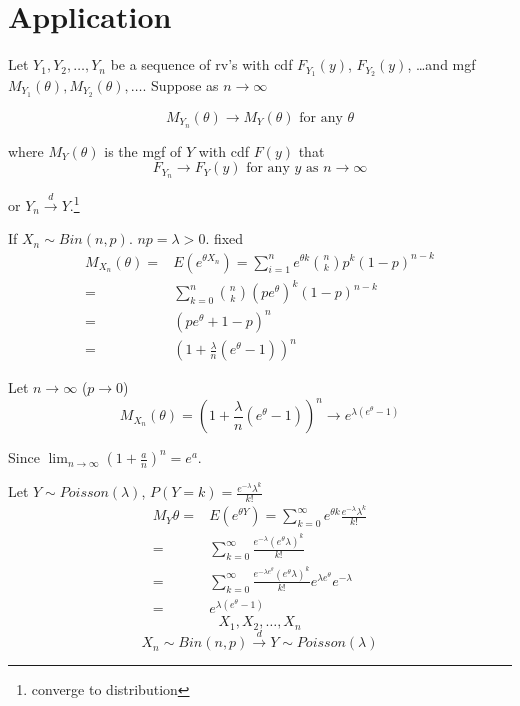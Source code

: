 \section{Application}
\begin{theo}
Let $Y_1,Y_2,\dots,Y_n$ be a sequence of rv's with cdf $F_{Y_1}(y)$, $F_{Y_2}(y)$, \dots and mgf $M_{Y_1}(\theta), M_{Y_2}(\theta),\dots $. Suppose as $n \to\infty$ 

\[M_{Y_n}(\theta) \rightarrow M_Y(\theta) \text{ for any }\theta\]

where $M_Y(\theta)$ is the mgf of $Y$ with cdf $F(y)$ that
\[F_{Y_n} \rightarrow F_Y(y) \text{ for any }y \text{ as }n \to \infty\]

or $Y_n\overset{d}{\longrightarrow} Y$.\footnote{converge to distribution}
\end{theo}

\begin{exmp}
If $X_n\sim Bin(n,p)$. $np=\lambda>0$. fixed
\begin{align*}
M_{X_n}(\theta)= & E(e^{\theta X_n}) =\sum_{i=1}^n e^{\theta k} {n \choose k} p^k (1-p)^{n-k}\\
= & \sum_{k=0}^n {n \choose k} (pe^{\theta})^k (1-p)^{n-k} \\
= & (pe^{\theta}+1-p)^n \\
= & \left(1+\frac{\lambda}{n}(e^{\theta}-1)\right)^n 
\end{align*}

Let $n \to \infty$ ($p\to 0$)
\[M_{X_n}(\theta)=  \left(1+\frac{\lambda}{n}(e^{\theta}-1)\right)^n \longrightarrow e^{\lambda(e^{\theta}-1)}\]

Since $\lim_{n\to \infty}\left(1+\frac{a}{n}\right)^n=e^a$.

Let $Y \sim Poisson(\lambda)$, $P(Y=k)=\frac{e^{-\lambda}\lambda^k}{k!}$
\begin{align*}
M_Y{\theta}= & E(e^{\theta Y}) =\sum_{k=0}^{\infty} e^{\theta k} \frac{e^{-\lambda}\lambda^k}{k!} \\
= & \sum_{k=0}^{\infty} \frac{e^{-\lambda}(e^{\theta} \lambda)^k}{k!} \\
= &  \sum_{k=0}^{\infty} \frac{e^{-\lambda e^{\theta}}(e^{\theta} \lambda)^k}{k!}  e^{\lambda e^{\theta}} e^{-\lambda} \\
= & e^{\lambda (e^{\theta}-1)} 
\end{align*}
\[X_1, X_2,\dots,X_n\]
\[X_n \sim Bin(n,p) \overset{d}{\longrightarrow} Y\sim Poisson(\lambda)\]
\end{exmp}



